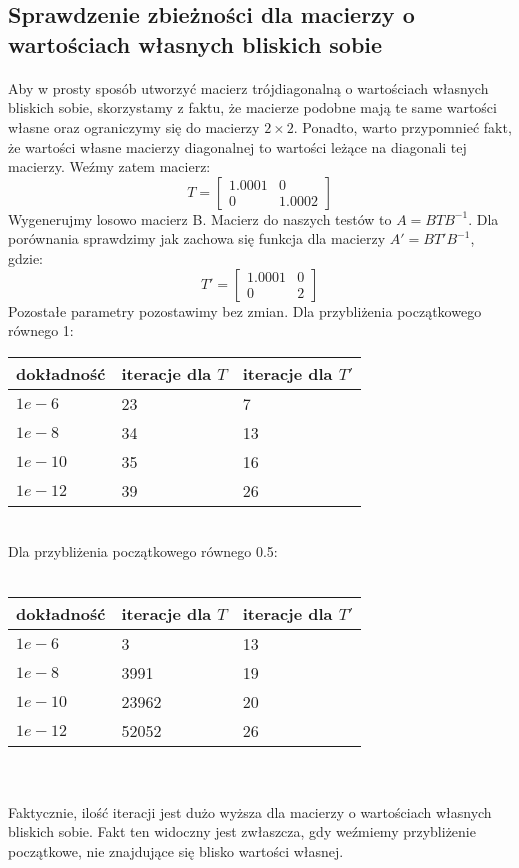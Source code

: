 \documentclass{article}
\begin{document}
\subsection{Sprawdzenie zbieżności dla macierzy o wartościach własnych bliskich sobie}
\paragraph{}
Aby w prosty sposób utworzyć macierz trójdiagonalną o wartościach własnych bliskich sobie, skorzystamy z faktu, że macierze podobne mają te same wartości własne oraz ograniczymy się do macierzy $2\times 2$. Ponadto, warto przypomnieć fakt, że wartości własne macierzy diagonalnej to wartości leżące na diagonali tej macierzy. Weźmy zatem macierz: 
$$T = \begin{bmatrix}
1.0001 & 0\\
0 & 1.0002
\end{bmatrix}$$
Wygenerujmy losowo macierz B. Macierz do naszych testów to $A = BTB^{-1}$. Dla porównania sprawdzimy jak zachowa się funkcja dla macierzy $A' = BT'B^{-1}$, gdzie:
$$T' = \begin{bmatrix}
1.0001 & 0\\
0 & 2
\end{bmatrix}$$
Pozostałe parametry pozostawimy bez zmian. Dla przybliżenia początkowego równego 1:\\
\vspace{4pt}
\begin{tabular}{ | l | l | l |}
    \hline
    dokładność & iteracje dla $T$ & iteracje dla $T'$\\ \hline
    $1e-6$ & 23 & 7 \\ \hline
    $1e-8$ & 34 & 13\\ \hline
    $1e-10$ & 35 & 16\\ \hline
    $1e-12$ & 39 & 26\\ 
    \hline
\end{tabular}\\
Dla przybliżenia początkowego równego 0.5:\\\\
\begin{tabular}{ | l | l | l |}
    \hline
    dokładność & iteracje dla $T$ & iteracje dla $T'$\\ \hline
    $1e-6$ & 3 & 13 \\ \hline
    $1e-8$ & 3991 & 19\\ \hline
    $1e-10$ & 23962 & 20\\ \hline
    $1e-12$ & 52052 & 26\\ 
    \hline
\end{tabular}\\\\
Faktycznie, ilość iteracji jest dużo wyższa dla macierzy o wartościach własnych bliskich sobie. Fakt ten widoczny jest zwłaszcza, gdy weźmiemy przybliżenie początkowe, nie znajdujące się blisko wartości własnej.
\end{document}
